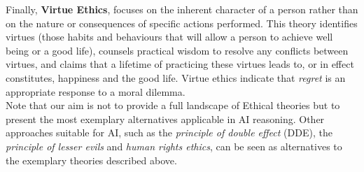 \documentclass[twocolumn]{article}
\begin{document}

Finally, \textbf{Virtue Ethics}, focuses on the inherent character of a person rather than on the nature or consequences of specific actions performed. This theory identifies virtues (those habits and behaviours that will allow a person to achieve well being or a good life), counsels practical wisdom to resolve any conflicts between virtues, and claims that a lifetime of practicing these virtues leads to, or in effect constitutes, happiness and the good life. Virtue ethics indicate that \textit{regret} is an appropriate response to a moral dilemma. \\

Note that our aim is not to provide a full landscape of Ethical theories but to present the most exemplary alternatives applicable in AI reasoning. Other approaches suitable for AI, such as the \textit{principle of double effect} (DDE), the  \textit{principle of lesser evils} and  \textit{human rights ethics}, can be seen as alternatives to the exemplary theories described above. 
\end{document}
